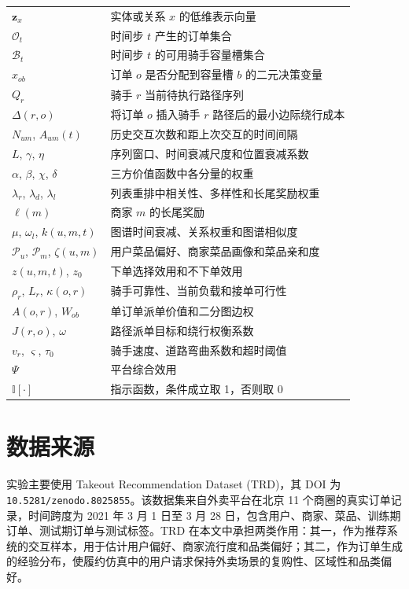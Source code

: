 \documentclass[12pt,a4paper]{article}
\begin{document}
{\begin{longtable}{>{\raggedright\arraybackslash}p{}>{\raggedright\arraybackslash}p{}}
        $\mathbf{z}_x$ & 实体或关系 $x$ 的低维表示向量 \\
        $\mathcal{O}_t$ & 时间步 $t$ 产生的订单集合 \\
        $\mathcal{B}_t$ & 时间步 $t$ 的可用骑手容量槽集合 \\
        $x_{ob}$ & 订单 $o$ 是否分配到容量槽 $b$ 的二元决策变量 \\
        $Q_r$ & 骑手 $r$ 当前待执行路径序列 \\
        $\Delta(r,o)$ & 将订单 $o$ 插入骑手 $r$ 路径后的最小边际绕行成本 \\
        $N_{um}$, $A_{um}(t)$ & 历史交互次数和距上次交互的时间间隔 \\
        $L$, $\gamma$, $\eta$ & 序列窗口、时间衰减尺度和位置衰减系数 \\
        $\alpha$, $\beta$, $\chi$, $\delta$ & 三方价值函数中各分量的权重 \\
        $\lambda_r$, $\lambda_d$, $\lambda_l$ & 列表重排中相关性、多样性和长尾奖励权重 \\
        $\ell(m)$ & 商家 $m$ 的长尾奖励 \\
        $\mu$, $\omega_l$, $k(u,m,t)$ & 图谱时间衰减、关系权重和图谱相似度 \\
        $\mathcal{P}_u$, $\mathcal{P}_m$, $\zeta(u,m)$ & 用户菜品偏好、商家菜品画像和菜品亲和度 \\
        $z(u,m,t)$, $z_0$ & 下单选择效用和不下单效用 \\
        $\rho_r$, $L_r$, $\kappa(o,r)$ & 骑手可靠性、当前负载和接单可行性 \\
        $A(o,r)$, $W_{ob}$ & 单订单派单价值和二分图边权 \\
        $J(r,o)$, $\omega$ & 路径派单目标和绕行权衡系数 \\
        $v_r$, $\varsigma$, $\tau_0$ & 骑手速度、道路弯曲系数和超时阈值 \\
        $\Psi$ & 平台综合效用 \\
        $\mathbb{I}[\cdot]$ & 指示函数，条件成立取 1，否则取 0 \\
    \end{longtable}
    }

    \section{数据来源}

    实验主要使用 Takeout Recommendation Dataset (TRD)，其 DOI 为 \texttt{10.5281/zenodo.8025855}\cite{trd2023}。该数据集来自外卖平台在北京 11 个商圈的真实订单记录，时间跨度为 2021 年 3 月 1 日至 3 月 28 日，包含用户、商家、菜品、训练期订单、测试期订单与测试标签。TRD 在本文中承担两类作用：其一，作为推荐系统的交互样本，用于估计用户偏好、商家流行度和品类偏好；其二，作为订单生成的经验分布，使履约仿真中的用户请求保持外卖场景的复购性、区域性和品类偏好。
\end{document}
